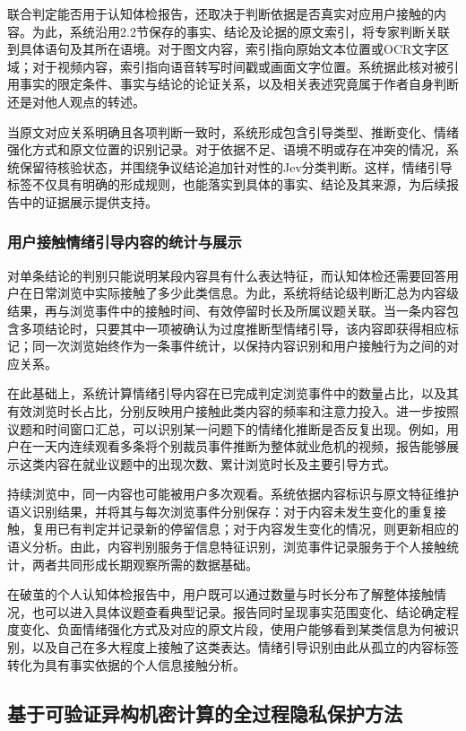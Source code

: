 联合判定能否用于认知体检报告，还取决于判断依据是否真实对应用户接触的内容。为此，系统沿用2.2节保存的事实、结论及论据的原文索引，将专家判断关联到具体语句及其所在语境。对于图文内容，索引指向原始文本位置或OCR文字区域；对于视频内容，索引指向语音转写时间戳或画面文字位置。系统据此核对被引用事实的限定条件、事实与结论的论证关系，以及相关表述究竟属于作者自身判断还是对他人观点的转述。

当原文对应关系明确且各项判断一致时，系统形成包含引导类型、推断变化、情绪强化方式和原文位置的识别记录。对于依据不足、语境不明或存在冲突的情况，系统保留待核验状态，并围绕争议结论追加针对性的Jev分类判断。这样，情绪引导标签不仅具有明确的形成规则，也能落实到具体的事实、结论及其来源，为后续报告中的证据展示提供支持。

\subsubsection{用户接触情绪引导内容的统计与展示}\label{section:2.3.4}

对单条结论的判别只能说明某段内容具有什么表达特征，而认知体检还需要回答用户在日常浏览中实际接触了多少此类信息。为此，系统将结论级判断汇总为内容级结果，再与浏览事件中的接触时间、有效停留时长及所属议题关联。当一条内容包含多项结论时，只要其中一项被确认为过度推断型情绪引导，该内容即获得相应标记；同一次浏览始终作为一条事件统计，以保持内容识别和用户接触行为之间的对应关系。

在此基础上，系统计算情绪引导内容在已完成判定浏览事件中的数量占比，以及其有效浏览时长占比，分别反映用户接触此类内容的频率和注意力投入。进一步按照议题和时间窗口汇总，可以识别某一问题下的情绪化推断是否反复出现。例如，用户在一天内连续观看多条将个别裁员事件推断为整体就业危机的视频，报告能够展示这类内容在就业议题中的出现次数、累计浏览时长及主要引导方式。

持续浏览中，同一内容也可能被用户多次观看。系统依据内容标识与原文特征维护语义识别结果，并将其与每次浏览事件分别保存：对于内容未发生变化的重复接触，复用已有判定并记录新的停留信息；对于内容发生变化的情况，则更新相应的语义分析。由此，内容判别服务于信息特征识别，浏览事件记录服务于个人接触统计，两者共同形成长期观察所需的数据基础。

在破茧的个人认知体检报告中，用户既可以通过数量与时长分布了解整体接触情况，也可以进入具体议题查看典型记录。报告同时呈现事实范围变化、结论确定程度变化、负面情绪强化方式及对应的原文片段，使用户能够看到某类信息为何被识别，以及自己在多大程度上接触了这类表达。情绪引导识别由此从孤立的内容标签转化为具有事实依据的个人信息接触分析。

\subsection{基于可验证异构机密计算的全过程隐私保护方法}\label{section:2.4}

